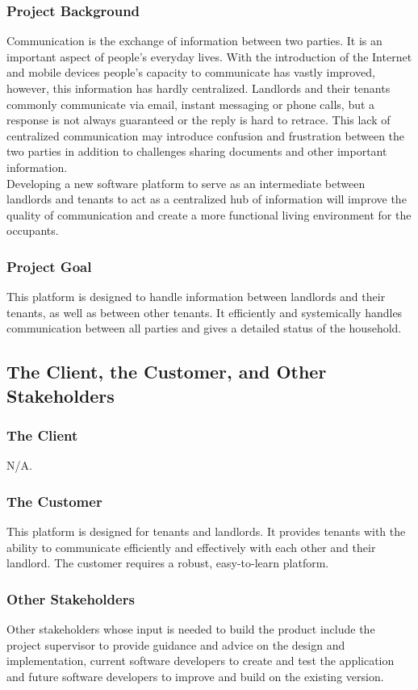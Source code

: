 \documentclass[12pt]{article}
\begin{document}
\subsubsection{Project Background}
Communication is the exchange of information between two parties. It is an important aspect of people's everyday lives. With the introduction 
of the Internet and mobile devices people's capacity to communicate has vastly 
improved, however, this information has hardly centralized. Landlords and their 
tenants commonly communicate via email, instant messaging or phone calls, but a response is not always guaranteed or the reply is hard to retrace. This lack of centralized 
communication may introduce confusion and frustration between the two parties in addition to challenges sharing documents and other important information.\\

\noindent Developing a new software platform to serve as an intermediate between 
landlords and tenants to act as a centralized hub of information will improve 
the quality of communication and create a more functional living environment 
for the occupants.

\subsubsection{Project Goal}
This platform is designed to handle information between landlords and their 
tenants, as well as between other tenants. It efficiently and systemically 
handles communication between all parties and gives a detailed status of the household.

\subsection{The Client, the Customer, and Other Stakeholders}
\subsubsection {The Client}
  N/A.
\subsubsection {The Customer}
This platform is designed for tenants and landlords. It provides tenants with the ability to communicate efficiently and effectively with each other and their landlord. The customer requires a robust, easy-to-learn platform.
\subsubsection {Other Stakeholders}
Other stakeholders whose input is needed to build the product include the project supervisor to provide guidance and advice on the design and implementation, current software developers to create and test the application and future software developers to improve and build on the existing version.
\end{document}
